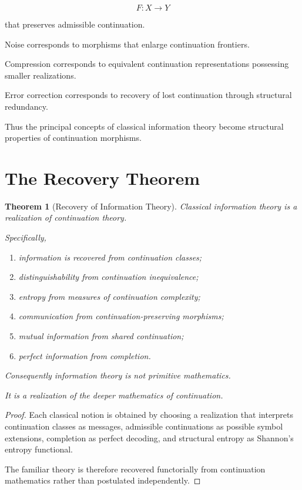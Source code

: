 \documentclass[13pt,openany]{book}
\theoremstyle{plain}
\newtheorem{theorem}{Theorem}[chapter]
\theoremstyle{definition}
\begin{document}
\[
F:X\rightarrow Y
\]

that preserves admissible continuation.

Noise corresponds to morphisms that enlarge continuation frontiers.

Compression corresponds to equivalent continuation representations possessing
smaller realizations.

Error correction corresponds to recovery of lost continuation through structural
redundancy.

Thus the principal concepts of classical information theory become structural
properties of continuation morphisms.

\section{The Recovery Theorem}

\begin{theorem}[Recovery of Information Theory]
Classical information theory is a realization of continuation theory.

Specifically,

\begin{enumerate}
\item information is recovered from continuation classes;

\item distinguishability from continuation inequivalence;

\item entropy from measures of continuation complexity;

\item communication from continuation-preserving morphisms;

\item mutual information from shared continuation;

\item perfect information from completion.
\end{enumerate}

Consequently information theory is not primitive mathematics.

It is a realization of the deeper mathematics of continuation.
\end{theorem}

\begin{proof}
Each classical notion is obtained by choosing a realization that interprets
continuation classes as messages, admissible continuations as possible symbol
extensions, completion as perfect decoding, and structural entropy as Shannon's
entropy functional.

The familiar theory is therefore recovered functorially from continuation
mathematics rather than postulated independently.
\end{proof}
\end{document}
